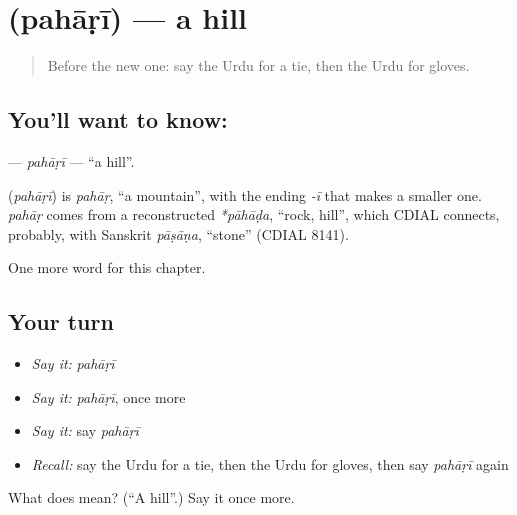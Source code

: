 \section[\texorpdfstring{\ur{پہاڑی} (pahāṛī)}{پہاڑی (pahāṛī)}]{ (pahāṛī) — a hill}

\label{lesson:UR-C122-pahari}



\begin{quote}
Before the new one: say the Urdu for a tie, then the Urdu for gloves.
\end{quote}

\subsection*{You'll want to know: }
\textbf{} — \emph{pahāṛī} — \textquotedblleft{}a hill\textquotedblright{}.

\begin{cousinweb}
\textbf{} (\emph{pahāṛī}) is \emph{pahāṛ}, \textquotedblleft{}a mountain\textquotedblright{}, with the ending \emph{-ī} that makes a smaller one. \emph{pahāṛ} comes from a reconstructed \emph{*pāhāḍa}, \textquotedblleft{}rock, hill\textquotedblright{}, which CDIAL connects, probably, with Sanskrit \emph{pāṣāṇa}, \textquotedblleft{}stone\textquotedblright{} (CDIAL 8141).
\end{cousinweb}

\begin{grammarlens}[title={What you've built}]
One more word for this chapter.
\end{grammarlens}

\subsection*{Your turn}
\begin{itemize}
\raggedright
  \item \emph{Say it:} \emph{pahāṛī}
  \item \emph{Say it:} \emph{pahāṛī}, once more
  \item \emph{Say it:} say \emph{pahāṛī}
  \item \emph{Recall:} say the Urdu for a tie, then the Urdu for gloves, then say \emph{pahāṛī} again
\end{itemize}

\begin{tcolorbox}[breakable,colback=teal!4,colframe=teal!35!black,title={Before you move on}]
What does  mean? (\textquotedblleft{}A hill\textquotedblright{}.) Say it once more.
\end{tcolorbox}
